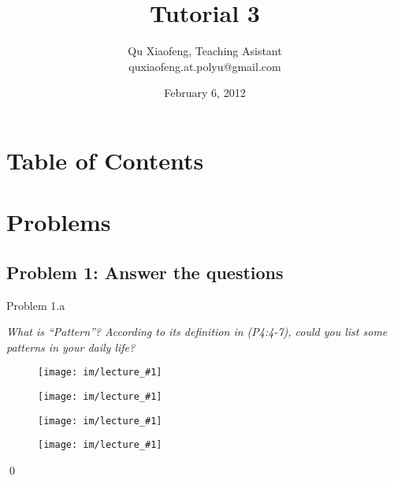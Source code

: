 \documentclass[
        ]{beamer}
\title{Tutorial 3}
\author[COMP435p]{Qu Xiaofeng\texorpdfstring{, Teaching Asistant\\\tiny{quxiaofeng.at.polyu@gmail.com}}{}}
\institute{COMP435p\\Biometrics Authentication}
\date{February 6, 2012}
\begin{document}
\newcommand{\inpdfu}[2]{\begin{figure}\centering\texttt{[image: im/lecture\_\#1]}\end{figure}}
\newcommand{\inpdfl}[2]{\begin{figure}\centering\texttt{[image: im/lecture\_\#1]}\end{figure}}
\newcommand{\inpdfc}[2]{\begin{figure}\centering\texttt{[image: im/lecture\_\#1]}\end{figure}}
\newcommand{\inpng}[1]{\begin{figure}\centering\texttt{[image: im/\#1]}\end{figure}}

\frame{\titlepage}

\section*{Table of Contents}

    \begin{frame}{\secname}
        \tableofcontents
    \end{frame}




\section{Problems}
    \subsection{Problem 1: Answer the questions}
        \begin{frame}[c]{Problem 1.a}
            \begin{overprint}            
            \emph{What is ``Pattern''? According to its definition in (P4:4-7), could you list some patterns in your daily life?}           
            	\onslide<2> \inpdfl{4}{2} %
            	 \inpdfu{4}{3} %
            	 \inpdfl{4}{3} %
            	 \inpdfu{4}{4} %
            		\qed
            \end{overprint}            
        \end{frame}
        
\end{document}
